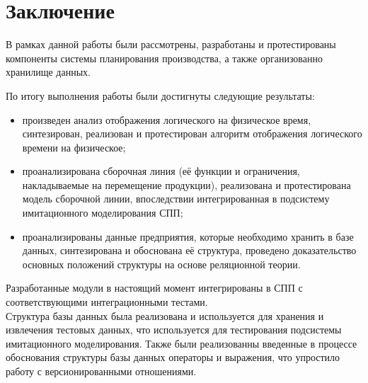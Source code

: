 \section*{Заключение}
В рамках данной работы были рассмотрены, разработаны и протестированы компоненты системы планирования производства, а также организованно хранилище данных.

По итогу выполнения работы были достигнуты следующие результаты:
\begin{itemize}
	\item произведен анализ отображения логического на физическое время, синтезирован, реализован и протестирован алгоритм отображения логического времени на физическое;
	\item проанализирована сборочная линия (её функции и ограничения, накладываемые на перемещение продукции), реализована и протестирована модель сборочной линии, впоследствии интегрированная в подсистему имитационного моделирования СПП;
	\item проанализированы данные предприятия, которые необходимо хранить в базе данных, синтезирована и обоснована её структура, проведено доказательство основных положений структуры на основе реляционной теории.
\end{itemize}

\indent Разработанные модули в настоящий момент интегрированы в СПП с соответствующими интеграционными тестами.\\
\indent Структура базы данных была реализована и используется для хранения и извлечения тестовых данных, что используется для тестирования подсистемы имитационного моделирования. 
Также были реализованны введенные в процессе обоснования структуры базы данных операторы и выражения, что упростило работу с версионированными отношениями.

\

